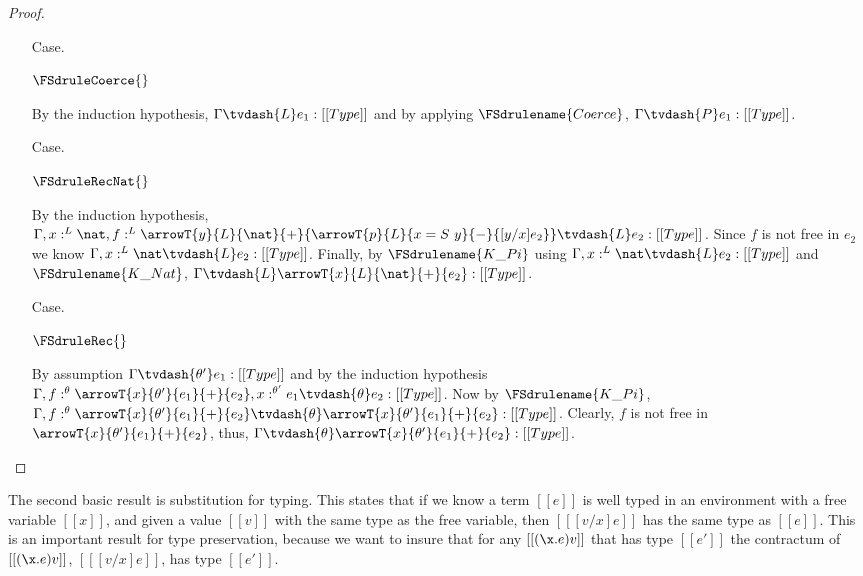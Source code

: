 \begin{proof}
\begin{itemize}
  \item[Case.] \ \\
    \begin{center}
      $\FSdruleCoerce{}$
    \end{center}
    By the induction hypothesis, $\Gamma \tvdash{L} e_1:[[Type]]$ and by applying 
    $\FSdrulename{Coerce}$, $\Gamma \tvdash{P} e_1:[[Type]]$.

  \item[Case.] \ \\
    \begin{center}
      $\FSdruleRecNat{}$
    \end{center}
    By the induction hypothesis, 
    $\Gamma, x:^L \nat,
    f:^L \arrowT{y}{L}{\nat}{+}{\arrowT{p}{L}{x=S\ y}{-}{[y/x]e_2}} \tvdash{L} e_2:[[Type]]$.  Since
    $f$ is not free in $e_2$ we know $\Gamma, x:^L \nat \tvdash{L} e_2:[[Type]]$.  Finally,
    by $\FSdrulename{K\_Pi}$ using $\Gamma, x:^L \nat \tvdash{L} e_2:[[Type]]$ and
    $\FSdrulename{K\_Nat}$, $\Gamma \tvdash{L} \arrowT{x}{L}{\nat}{+}{e_2}:[[Type]]$.


  \item[Case.] \ \\
    \begin{center}
      $\FSdruleRec{}$
    \end{center}
    By assumption $\Gamma \tvdash{\theta'} e_1:[[Type]]$ and by the induction hypothesis
    $\Gamma, f:^\theta \arrowT{x}{\theta'}{e_1}{+}{e_2},x:^{\theta'} e_1 \tvdash{\theta} e_2:[[Type]]$.
    Now by $\FSdrulename{K\_Pi}$, $\Gamma, f:^\theta \arrowT{x}{\theta'}{e_1}{+}{e_2} 
    \tvdash{\theta} \arrowT{x}{\theta'}{e_1}{+}{e_2}:[[Type]]$. Clearly, $f$ is not free in
    $\arrowT{x}{\theta'}{e_1}{+}{e_2}$, thus, 
    $\Gamma \tvdash{\theta} \arrowT{x}{\theta'}{e_1}{+}{e_2}:[[Type]]$.

  \end{itemize}
\end{proof}

The second basic result is substitution for typing.  This states that
if we know a term $[[e]]$ is well typed in an environment with a free
variable $[[x]]$, and given a value $[[v]]$ with the same type as the
free variable, then $[[ [v/x]e]]$ has the same type as $[[e]]$.  This
is an important result for type preservation, because we want to
insure that for any $[[(\x.e) v]]$ that has type $[[e']]$ the
contractum of $[[(\x.e) v]]$, $[[ [v/x]e]]$, has type $[[e']]$.


